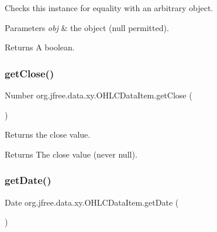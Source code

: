 Checks this instance for equality with an arbitrary object.


\begin{DoxyParams}{Parameters}
{\em obj} & the object ({\ttfamily null} permitted).\\
\hline
\end{DoxyParams}
\begin{DoxyReturn}{Returns}
A boolean. 
\end{DoxyReturn}
\mbox{\label{classorg_1_1jfree_1_1data_1_1xy_1_1_o_h_l_c_data_item_a336769e124f6f206aa8749bd93c60c54}} 
\subsubsection{\texorpdfstring{get\+Close()}{getClose()}}
{\footnotesize\ttfamily Number org.\+jfree.\+data.\+xy.\+O\+H\+L\+C\+Data\+Item.\+get\+Close (\begin{DoxyParamCaption}{ }\end{DoxyParamCaption})}

Returns the close value.

\begin{DoxyReturn}{Returns}
The close value (never {\ttfamily null}). 
\end{DoxyReturn}
\mbox{\label{classorg_1_1jfree_1_1data_1_1xy_1_1_o_h_l_c_data_item_ada6c019c57e40731a78631e60641aa2d}} 
\subsubsection{\texorpdfstring{get\+Date()}{getDate()}}
{\footnotesize\ttfamily Date org.\+jfree.\+data.\+xy.\+O\+H\+L\+C\+Data\+Item.\+get\+Date (\begin{DoxyParamCaption}{ }\end{DoxyParamCaption})}

